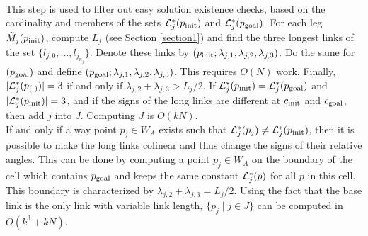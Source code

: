 \documentclass[twocolumn]{IEEEtran}
\begin{document}
\medskip  \\
 This step is used to filter out easy
solution existence checks, based on the cardinality and members of
the sets ${\cal L}_j^*(p_{\rm init})$ and ${\cal L}_j^*(p_{\rm
goal})$. For each leg $\tilde M_j(p_{\rm init})$, compute $L_j$ (see
Section \ref{section1}) and find the three longest links of the set
$\{l_{j,0},...,l_{j_{n_j}} \}$.  Denote these links by $(p_{\rm
init}; \lambda_{j,1},\lambda_{j,2},\lambda_{j,3})$.  Do the same for
$(p_{\rm goal})$ and define $(p_{\rm goal};
\lambda_{j,1},\lambda_{j,2},\lambda_{j,3})$. This requires $O(N)$
work. Finally, $|{\cal L}_j^*(p_{(\cdot)})| = 3$ if and only if
$\lambda_{j,2} + \lambda_{j,3} > L_j/2$.  If ${\cal L}_j^*(p_{\rm
init}) = {\cal L}_j^*(p_{\rm goal})$ and $|{\cal L}_j^*(p_{\rm
init})| = 3$, and if the signs of the long links are different at
$c_{\rm init}$ and $c_{\rm goal}$, then add $j$ into $J$.
Computing $J$ is $O(kN)$. \medskip  \\
 If
and only if a way point $p_j \in W_A$ exists such that ${\cal L}_j^*(p_j) \neq {\cal
L}_j^*(p_{\rm init})$, then it is possible to make the long links
colinear and thus change the signs of their relative angles. This
can be done by computing a point $p_j \in W_A$ on the boundary of the
cell which contains $p_{\rm goal}$ and keeps the same constant
${\cal L}_j^*(p)$ for all $p$ in this cell. This boundary is
characterized by $\lambda_{j,2}+\lambda_{j,3}=L_j/2$. Using the fact
that the base link is the only link with variable link length, $\{p_j \mid j \in J\}$
can be computed in $O(k^3+kN)$.
\end{document}
